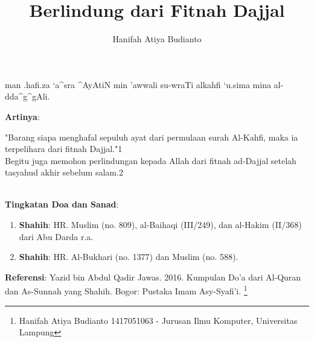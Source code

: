 \documentclass[a4paper,12pt]{article}
\title{\Large Berlindung dari Fitnah Dajjal}
\author{\calligra Hanifah Atiya Budianto}
\begin{document}
\sffamily
\maketitle 
\fullvocalize
{}
\begin{arabtext}
\noindent
man .hafi.za `a^sra ^AyAtiN min 'awwali su-wraTi alkahfi `u.sima mina 
al-dda^g^gAli.\\
\end{arabtext}
\noindent
\textbf{Artinya}:
\par
\indent
"Barang siapa menghafal sepuluh ayat dari permulaan surah Al-Kahfi, maka ia
terpelihara dari fitnah Dajjal."{\scriptsize 1}\\
\indent
Begitu juga memohon perlindungan kepada Allah dari fitnah ad-Dajjal setelah
tasyahud akhir sebelum salam.{\scriptsize 2}\\\\
\par
\noindent
\textbf{Tingkatan Doa dan Sanad}:
\begin{enumerate}
\item \textbf{Shahih}: HR. Muslim (no. 809), al-Baihaqi (III/249), dan 
al-Hakim (II/368) dari Abu Darda r.a.
\item \textbf{Shahih}: HR. Al-Bukhari (no. 1377) dan Muslim (no. 588).
\end{enumerate}
\textbf{Referensi}: Yazid bin Abdul Qadir Jawas. 2016. Kumpulan Do'a dari
Al-Quran dan As-Sunnah yang Shahih. Bogor: Pustaka Imam Asy-Syafi'i.
\footnote{Hanifah Atiya Budianto 1417051063 - Jurusan Ilmu Komputer,
Universitas Lampung}
\end{document}
